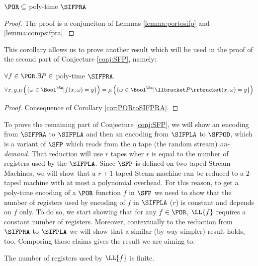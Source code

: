 \begin{cor}
  \label{cor:PORtoSIFPRA}
  $\POR\subseteq$ poly-time $\SIFPRA$
\end{cor}
\begin{proof}
  The proof is a conjunciton of Lemmas \ref{lemma:portosifp} and \ref{lemma:compsifpra}.
\end{proof}

This corollary allows us to prove another result which will be used in the proof
of the second part of Conjecture \ref{conj:SFP}, namely:

\begin{cor}
  \label{cor:PORtoSIFPRAweak}
  $\forall f \in \POR.\exists P \in$ poly-time $\SIFPRA.$
  $$
  \forall x, y.
  \mu\left(\{\omega \in \Bool^\Ss| f(x, \omega)=y\}\right)=
  \mu\left(\{\omega \in \Bool^\Ss| \llbracket P\rrbracket (x, \omega)=y\}\right)
  $$
\end{cor}
\begin{proof}
  Consequence of Corollary \ref{cor:PORtoSIFPRA}.
\end{proof}

To prove the remaining part of
Conjecture \ref{conj:SFP},
we will show an encoding from $\SIFPRA$ to $\SIFPLA$ and then
an encoding from $\SIFPLA$ to $\SFPOD$, which is a variant
of $\SFP$ which reads from the $\eta$ tape (the random stream) \emph{on-demand}.
%
That reduction will use $r$ tapes wher $r$ is equal to the number of registers
used by the $\SIFPLA$. Since $\SFP$ is defined on two-taped Stream Machines, we
will show that a $r+1$-taped Steam machine can be reduced to a $2$-taped
machine with at most a polynomial overhead. For this reason, to get a poly-time
encoding of a $\POR$ function $f$ in $\SFP$ we need to show
that the number of registers used by encoding of $f$ in $\SIFPLA$ ($r$) is
constant and depends on $f$ only. To do so, we start showing that
for any $f \in \POR$, $\LL{f}$ requires a constant number of registers.
Moreover, contextually to the reduction from $\SIFPRA$ to $\SIFPLA$
we will show that a similar (by way simpler) result holds, too.
Composing those claims gives the result we are aiming to.

\begin{remark}
The number of registers used by $\LL{f}$ is finite.
\end{remark}

